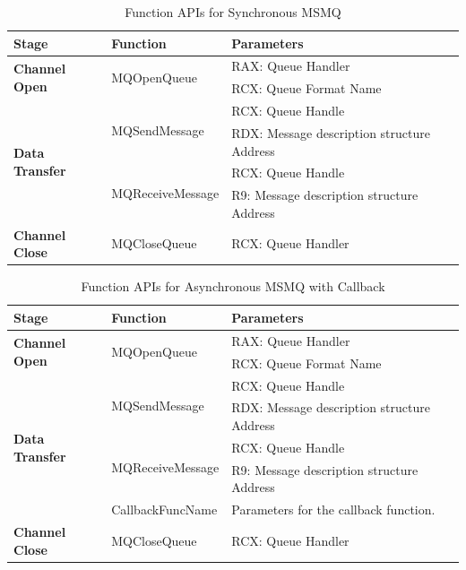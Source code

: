    \begin{table}[H]
        \centering
        \caption{Function APIs for Synchronous MSMQ}
        \label{msmqsynfunctions}
        \begin{tabular}{|l|l|l|}
            \hline
             \textbf{Stage} & \textbf{Function}& \textbf{Parameters}  \\
             \hline
             \multirow{2}{*}{{\textbf{Channel Open}}}
             &\multirow{2}{*}{{MQOpenQueue}} &  RAX: Queue Handler\\
              \cline{3-3} 
             & &  RCX: Queue Format Name\\
            \hline
             \multirow{4}{*}{{\textbf{Data Transfer}}}
             &\multirow{2}{*}{MQSendMessage} &  RCX: Queue Handle \\
              \cline{3-3} 
             &&  RDX: Message description structure Address \\
            \cline{2-3}
             & \multirow{2}{*}{MQReceiveMessage}&  RCX: Queue Handle \\
              \cline{3-3} 
              &&  R9: Message description structure Address \\
            \hline
            \textbf{Channel Close} &MQCloseQueue & RCX: Queue Handler \\
            \hline
        \end{tabular}
    \end{table}


    \begin{table}[H]
        \centering
        \caption{Function APIs for Asynchronous MSMQ with Callback}
        \label{msmqasynfunctionscallback}
        \begin{tabular}{|l|l|l|}
            \hline
             \textbf{Stage} & \textbf{Function}& \textbf{Parameters}  \\
             \hline
             \multirow{2}{*}{{\textbf{Channel Open}}}
             &\multirow{2}{*}{{MQOpenQueue}} &  RAX: Queue Handler\\
              \cline{3-3} 
             & &  RCX: Queue Format Name\\
            \hline
             \multirow{5}{*}{\textbf{Data Transfer}}
             &\multirow{2}{*}{MQSendMessage} &  RCX: Queue Handle \\
              \cline{3-3} 
             &&  RDX: Message description structure Address \\
            \cline{2-3}
             & \multirow{2}{*}{MQReceiveMessage}&  RCX: Queue Handle \\
              \cline{3-3} 
              &&  R9: Message description structure Address \\
                            \cline{2-3} 
              &CallbackFuncName&  Parameters for the callback function. \\
            \hline
            \textbf{Channel Close} &MQCloseQueue & RCX: Queue Handler \\
            \hline
        \end{tabular}
    \end{table}




